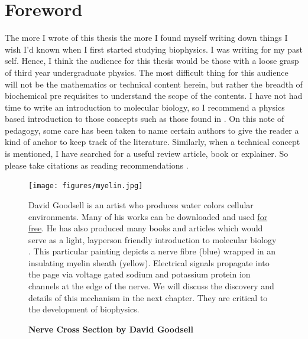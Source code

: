 \chapter*{Foreword}
\label{chap:foreword}
 {}

The more I wrote of this thesis the more I found myself writing down things I wish I'd known when I first started studying biophysics. I was writing for my past self. Hence, I think the audience for this thesis would be those with a loose grasp of third year undergraduate physics. The most difficult thing for this audience will not be the mathematics or technical content herein, but rather the breadth of biochemical pre requisites to understand the scope of the contents. I have not had time to write an introduction to molecular biology, so I recommend a physics based introduction to those concepts such as those found in \cite{phillips2012}. On this note of pedagogy, some care has been taken to name certain authors to give the reader a kind of anchor to keep track of the literature. Similarly, when a technical concept is mentioned, I have searched for a useful review article, book or explainer. So please take citations as reading recommendations \cite{dawkins1989, hofstadter1999}.

\begin{figure}[h]
	\begin{center}
		\texttt{[image: figures/myelin.jpg]}
	\end{center}
	\captionsetup{singlelinecheck = false, justification=raggedright}
	\caption[Nerve Cross Section by David Goodsell] {\textbf{Nerve Cross Section by David Goodsell}}{David Goodsell is an artist who produces water colors cellular environments. Many of his works can be downloaded and used \href{https://pdb101.rcsb.org/sci-art/goodsell-gallery}{for free}. He has also produced many books and articles which would serve as a light, layperson friendly introduction to molecular biology \cite{goodsell2009, goodsell2018, goodsell2020}. This particular painting depicts a nerve fibre (blue) wrapped in an insulating myelin sheath (yellow). Electrical signals propagate into the page via voltage gated sodium and potassium protein ion channels at the edge of the nerve. We will discuss the discovery and details of this mechanism in the next chapter. They are critical to the development of biophysics.}
	\label{goodsell_figure}
\end{figure}

